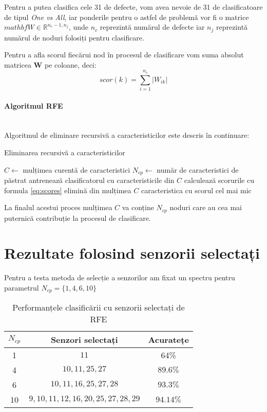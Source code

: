 Pentru a putea clasifica cele 31 de defecte, vom avea nevoie de 31 de clasificatoare de tipul \textit{One vs All}, iar ponderile pentru o astfel de problemă vor fi o matrice $mathbf{\textit{W}} \in \mathbb{R}^{n_{c}-1, n_{j}}$, unde $n_c$ reprezintă numărul de defecte iar $n_j$ reprezintă numărul de noduri folosiți pentru clasificare.

Pentru a afla scorul fiecărui nod în procesul de clasificare vom suma absolut matricea $\mathbf{W}$ pe coloane, deci:
\begin{equation}
    scor(k) = \sum_{i=1}^{n_c} |W_{ik}|
    \label{eq:scores}
\end{equation}

\paragraph{Algoritmul RFE} \mbox{} \\

Algoritmul de eliminare recursivă a caracteristicilor este descris în continuare:
\begin{algorithm2e}
\caption{Eliminarea recursivă a caracteristicilor}
\label{alg:rfe}
$C \leftarrow$ mulțimea curentă de caracteristici\;
$N_{cp} \leftarrow$ număr de caracteristici de păstrat\;
 {
    antrenează clasificatorul cu caracteristicile din $C$\;
    calculează scorurile cu formula \eqref{eq:scores}\;
    elimină din mulțimea $C$ caracteristica cu scorul cel mai mic
}
\end{algorithm2e}

La finalul acestui proces mulțimea $C$ va conține $N_{cp}$ noduri care au cea mai puternică contribuție la procesul de clasificare.

\section{Rezultate folosind senzorii selectați}

Pentru a testa metoda de selecție a senzorilor am fixat un spectru pentru parametrul $N_{cp} = \{1, 4, 6, 10\}$ 

\begin{table}
    \centering
    \begin{tabular}{|c|c|c|}
    \hline
        $N_{cp}$ & Senzori selectați & Acuratețe \\
        \hline
        1 & $11$ & 64\% \\
        \hline
        4 & $10, 11, 25, 27$ & $89.6\%$\\
        \hline
        6 & $10, 11, 16, 25, 27, 28$ & $93.3\%$\\
        \hline
        10 & $ 9, 10, 11, 12, 16, 20, 25, 27, 28, 29 $ & $94.14\%$ \\
        \hline
    \end{tabular}
    \caption{Performanțele clasificării cu senzorii selectați de RFE}
    \label{tab:rfe_selected_sensors}
\end{table}

